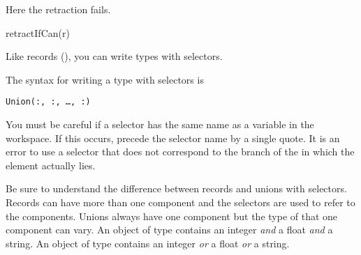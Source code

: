 \begin{xtc}
\begin{xtccomment}
Here the retraction fails.
\end{xtccomment}
\begin{spadsrc}
retractIfCan(r) 
\end{spadsrc}
\begin{TeXOutput}
\begin{fricasmath}{13}
%
\end{fricasmath}
\end{TeXOutput}
\end{xtc}


Like records (),
you can write  types
with selectors.

\beginImportant
The syntax for writing a  type with selectors is
\begin{center}
{\tt Union(:, :, \ldots, :)}
\end{center}
You must be careful if a selector has the same name as a variable in the
workspace.
If this occurs, precede the selector name by a single
quote.
It is an error to use a selector that does not correspond to the branch of
the  in which the element actually lies.
\endImportant

Be sure to understand the difference between records and unions
with selectors.
Records can have more than one component and the selectors are
used to refer to the components.
Unions always have one component but the type of that one
component can vary.
An object of type 
contains an integer {\it and} a float  {\it and} a
string.
An object of type 
contains an integer {\it or} a float  {\it or} a
string.

